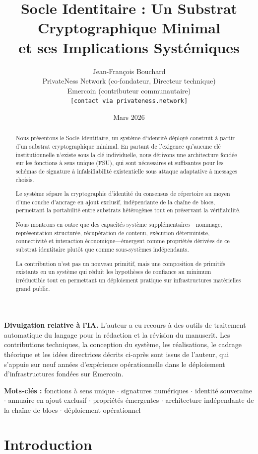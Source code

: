 \documentclass[11pt,a4paper]{article}
\title{\textbf{Socle Identitaire : Un Substrat Cryptographique Minimal\\
et ses Implications Systémiques}}
\author{Jean-François Bouchard\\
  \small PrivateNess Network (co-fondateur, Directeur technique)\\
  \small Emercoin (contributeur communautaire)\\
  \small \texttt{[contact via privateness.network]}}
\date{Mars 2026}
\begin{document}
\maketitle

\noindent\textbf{Divulgation relative à l'IA.} L'auteur a eu recours à des
outils de traitement automatique du langage pour la rédaction et la révision
du manuscrit.  Les contributions techniques, la conception du système, les
réalisations, le cadrage théorique et les idées directrices décrits ci-après
sont issus de l'auteur, qui s'appuie sur neuf années d'expérience
opérationnelle dans le déploiement d'infrastructures fondées sur Emercoin.

\begin{abstract}
Nous présentons le Socle Identitaire, un système d'identité déployé construit
à partir d'un substrat cryptographique minimal.  En partant de l'exigence
qu'aucune clé institutionnelle n'existe sous la clé individuelle, nous
dérivons une architecture fondée sur les fonctions à sens unique (FSU), qui
sont nécessaires et suffisantes pour les schémas de signature à
infalsifiabilité existentielle sous attaque adaptative à messages choisis.

Le système sépare la cryptographie d'identité du consensus de répertoire au
moyen d'une couche d'ancrage en ajout exclusif, indépendante de la chaîne de
blocs, permettant la portabilité entre substrats hétérogènes tout en
préservant la vérifiabilité.

Nous montrons en outre que des capacités système supplémentaires---nommage,
représentation structurée, récupération de contenu, exécution déterministe,
connectivité et interaction économique---émergent comme propriétés dérivées de
ce substrat identitaire plutôt que comme sous-systèmes indépendants.

La contribution n'est pas un nouveau primitif, mais une composition de
primitifs existants en un système qui réduit les hypothèses de confiance au
minimum irréductible tout en permettant un déploiement pratique sur
infrastructures matérielles grand public.
\end{abstract}

\noindent\textbf{Mots-clés :} fonctions à sens unique $\cdot$ signatures
numériques $\cdot$ identité souveraine $\cdot$ annuaire en ajout exclusif
$\cdot$ propriétés émergentes $\cdot$ architecture indépendante de la chaîne
de blocs $\cdot$ déploiement opérationnel

\section{Introduction}
\end{document}
